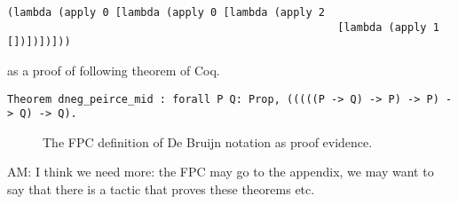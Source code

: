\begin{lstlisting}[basicstyle=\ttfamily,language=lprolog]
(lambda (apply 0 [lambda (apply 0 [lambda (apply 2 
                                                    [lambda (apply 1 [])])])]))
\end{lstlisting}
as a proof of following theorem of Coq.
\begin{lstlisting}[basicstyle=\ttfamily,language=lprolog]
Theorem dneg_peirce_mid : forall P Q: Prop, (((((P -> Q) -> P) -> P) -> Q) -> Q).
\end{lstlisting}

\begin{figure}


\caption{The FPC definition of De Bruijn notation as proof evidence.}
\label{fig:debruijn}
\end{figure}

\begin{metanote}
  AM: I think we need more: the FPC may go to the appendix, we may want to say that there is a tactic that proves these theorems etc. 
\end{metanote}



